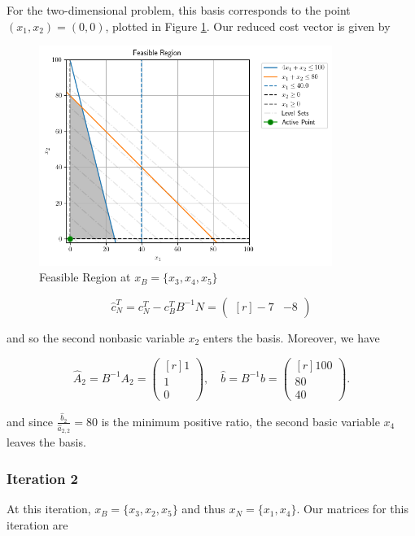 \begin{solution}
  For the two-dimensional problem, this basis corresponds to the point $(x_1, x_2) = (0, 0)$, plotted in 
  Figure \ref{fig:problem_1v_iteration_1}. Our reduced cost vector is given by 

  \begin{figure}[h]
    \centering
    \includegraphics*[width=0.85\textwidth]{problem_1v_1.png}
    \caption{Feasible Region at $x_B = \{x_3, x_4, x_5 \}$}
    \label{fig:problem_1v_iteration_1}
  \end{figure}

  $$
  \hat{c}_N^T = c_N^T - c_B^T B^{-1} N = \begin{pmatrix*}[r]
    -7 & -8
  \end{pmatrix*}
  $$

  and so the second nonbasic variable $x_2$ enters the basis. Moreover, we have
  
  $$
  \hat{A}_2 = B^{-1} A_2 = \begin{pmatrix*}[r]
    1  \\
    1  \\
    0
  \end{pmatrix*}, \quad \hat{b} = B^{-1} b = \begin{pmatrix*}[r]
    100 \\
     80 \\
     40
  \end{pmatrix*}.
  $$

  and since $\frac{\hat{b}_2}{\hat{a}_{2,2}} = 80$ is the minimum positive ratio, the second basic variable 
  $x_4$ leaves the basis.

  \pagebreak
  \subsubsection*{Iteration 2}
  At this iteration, $x_B = \{x_3, x_2, x_5\}$ and thus $x_N = \{x_1, x_4\}$. Our matrices for this iteration are


\end{solution}
